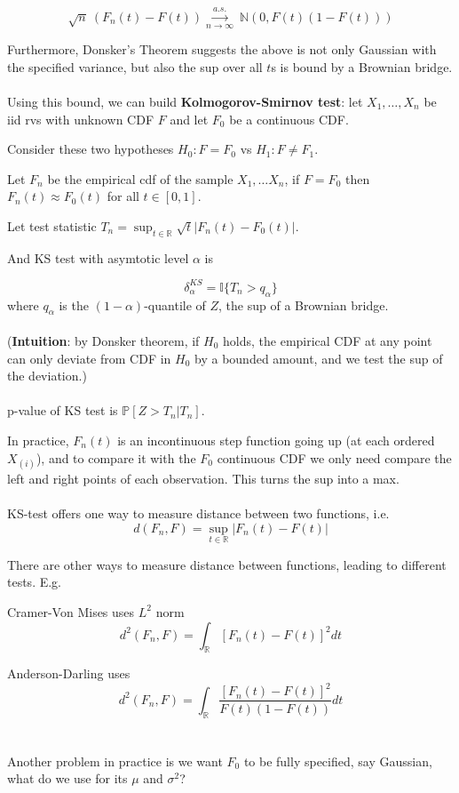 \documentclass{article}
\begin{document}
$$
\sqrt{n} ~ (F_n(t) - F(t)) \overset{a.s.}{\underset{n \to \infty}{\longrightarrow}} ~ \mathbb{N}(0, F(t) (1 - F(t)))
$$

Furthermore, Donsker's Theorem suggests the above is not only Gaussian with the specified variance, but also the sup over all $t$s is bound by a Brownian bridge.
\\
\\
Using this bound, we can build \textbf{Kolmogorov-Smirnov test}: let $X_1, \dots, X_n$ be iid rvs with unknown CDF $F$ and let $F_0$ be a continuous CDF.

Consider these two hypotheses $H_0: F = F_0$ vs $H_1: F \neq F_1$.

Let $F_n$ be the empirical cdf of the sample $X_1, \dots X_n$, if $F = F_0$ then $F_n(t) \approx F_0(t)$ for all $t \in [0, 1]$.

Let test statistic $T_n = \sup_{t \in \mathbb{R}} \sqrt{t}|F_n(t) - F_0(t)|$.

And KS test with asymtotic level $\alpha$ is

$$
\delta_{\alpha}^{KS} = \mathbb{I} \{T_n > q_{\alpha}\}
$$
where $q_{\alpha}$ is the $(1-\alpha)$-quantile of $Z$, the sup of a Brownian bridge.
\\
\\
(\textbf{Intuition}: by Donsker theorem, if $H_0$ holds, the empirical CDF at any point can only deviate from CDF in $H_0$ by a bounded amount, and we test the sup of the deviation.)
\\
\\
p-value of KS test is $\mathbb{P}[Z > T_n | T_n]$.

In practice, $F_{n}(t)$ is an incontinuous step function going up (at each ordered $X_{(i)}$),
and to compare it with the $F_0$ continuous CDF we only need compare the left and right points of each observation.
This turns the sup into a max.
\\
\\
KS-test offers one way to measure distance between two functions, i.e.
$$
d(F_n, F) = \sup_{t \in \mathbb{R}} |F_n(t) - F(t)|
$$

There are other ways to measure distance between functions, leading to different tests.
E.g.

Cramer-Von Mises uses $L^2$ norm
$$
d^2(F_n, F) = \int_{\mathbb{R}} [F_n(t) - F(t)]^2 dt
$$

Anderson-Darling uses
$$
d^2(F_n, F) = \int_{\mathbb{R}} \frac{[F_n(t) - F(t)]^2}{F(t) (1 - F(t))} dt
$$
\\
\\
Another problem in practice is we want $F_0$ to be fully specified, say Gaussian, what do we use for its $\mu$ and $\sigma^2$?
\end{document}
